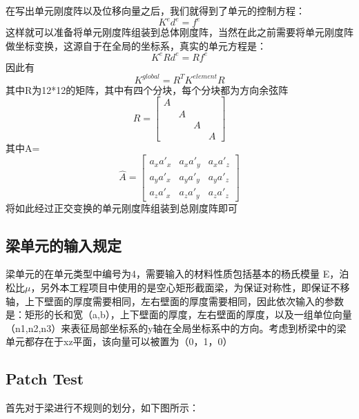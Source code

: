 \documentclass[forprint]{WHUBachelor}
\begin{document}
在写出单元刚度阵以及位移向量之后，我们就得到了单元的控制方程：
\begin{equation} 
K^{e} d^{e}=f^{e}
 \end{equation}
这样就可以准备将单元刚度阵组装到总体刚度阵，当然在此之前需要将单元刚度阵做坐标变换，这源自于在全局的坐标系，真实的单元方程是：
\begin{equation} 
K^{e} R d^{e}= R f^{e}
 \end{equation}
因此有
\begin{equation} 
K^{global} = R^T K^{element} R
 \end{equation}
其中R为12*12的矩阵，其中有四个分块，每个分块都为方向余弦阵
\begin{equation} 
R = 
\begin{bmatrix}
A & & & \\
& A & & \\
& & A & \\
& & & A 
\end{bmatrix}
\end{equation}
其中A=
\begin{equation} 
\hat{A}=\left[\begin{array}{lll}{a_{x} a'_{x}} & {a_{x} a'_{y}} & {a_{x} a'_{z}} \\ {a_{y} a'_{x}} & {a_{y} a'_{y}} & {a_{y} a'_{z}} \\ {a_{z} a'_{x}} & {a_{z} a'_{y}} & {a_{z} a'_{z}}\end{array}\right]
 \end{equation}
将如此经过正交变换的单元刚度阵组装到总刚度阵即可
\subsection{梁单元的输入规定}
梁单元的在单元类型中编号为4，需要输入的材料性质包括基本的杨氏模量 E，泊松比$\mu$，另外本工程项目中使用的是空心矩形截面梁，为保证对称性，即保证不移轴，上下壁面的厚度需要相同，左右壁面的厚度需要相同，因此依次输入的参数是：矩形的长和宽（a,b），上下壁面的厚度，左右壁面的厚度，以及一组单位向量（n1,n2,n3）来表征局部坐标系的y轴在全局坐标系中的方向。考虑到桥梁中的梁单元都存在于xz平面，该向量可以被置为（0，1，0）
\subsection{Patch Test}
首先对于梁进行不规则的划分，如下图所示：
\end{document}
